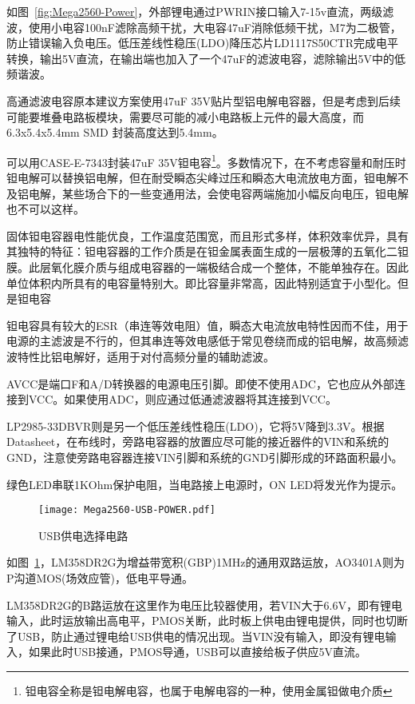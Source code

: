 如图~\ref{fig:Mega2560-Power}，外部锂电通过PWRIN接口输入7-15v直流，两级滤波，使用小电容100nF滤除高频干扰，大电容47uF消除低频干扰，M7为二极管，防止错误输入负电压。低压差线性稳压(LDO)降压芯片LD1117S50CTR完成电平转换，输出5V直流，在输出端也加入了一个47uF的滤波电容，滤除输出5V中的低频谐波。

高通滤波电容原本建议方案使用47uF 35V贴片型铝电解电容器，但是考虑到后续可能要堆叠电路板模块，需要尽可能的减小电路板上元件的最大高度，而6.3x5.4x5.4mm SMD 封装高度达到5.4mm。

可以用CASE-E-7343封装47uF 35V钽电容\footnote{钽电容全称是钽电解电容，也属于电解电容的一种，使用金属钽做电介质}。多数情况下，在不考虑容量和耐压时钽电解可以替换铝电解，但在耐受瞬态尖峰过压和瞬态大电流放电方面，钽电解不及铝电解，某些场合下的一些变通用法，会使电容两端施加小幅反向电压，钽电解也不可以这样。

固体钽电容器电性能优良，工作温度范围宽，而且形式多样，体积效率优异，具有其独特的特征：钽电容器的工作介质是在钽金属表面生成的一层极薄的五氧化二钽膜。此层氧化膜介质与组成电容器的一端极结合成一个整体，不能单独存在。因此单位体积内所具有的电容量特别大。即比容量非常高，因此特别适宜于小型化。但是钽电容

钽电容具有较大的ESR（串连等效电阻）值，瞬态大电流放电特性因而不佳，用于电源的主滤波是不行的，但其串连等效电感低于常见卷绕而成的铝电解，故高频滤波特性比铝电解好，适用于对付高频分量的辅助滤波。

AVCC是端口F和A/D转换器的电源电压引脚。即使不使用ADC，它也应从外部连接到VCC。如果使用ADC，则应通过低通滤波器将其连接到VCC。

LP2985-33DBVR则是另一个低压差线性稳压(LDO)，它将5V降到3.3V。根据Datasheet，在布线时，旁路电容器的放置应尽可能的接近器件的VIN和系统的GND，注意使旁路电容器连接VIN引脚和系统的GND引脚形成的环路面积最小。

绿色LED串联1KOhm保护电阻，当电路接上电源时，ON LED将发光作为提示。

\begin{figure}[htbp]
    \centering
    \texttt{[image: Mega2560-USB-POWER.pdf]}
    \caption{USB供电选择电路}
    \label{fig:Mega2560-USB-POWER}
\end{figure}

如图~\ref{fig:Mega2560-USB-POWER}，LM358DR2G为增益带宽积(GBP)1MHz的通用双路运放，AO3401A则为P沟道MOS(场效应管)，低电平导通。

LM358DR2G的B路运放在这里作为电压比较器使用，若VIN大于6.6V，即有锂电输入，此时运放输出高电平，PMOS关断，此时板上供电由锂电提供，同时也切断了USB，防止通过锂电给USB供电的情况出现。当VIN没有输入，即没有锂电输入，如果此时USB接通，PMOS导通，USB可以直接给板子供应5V直流。

